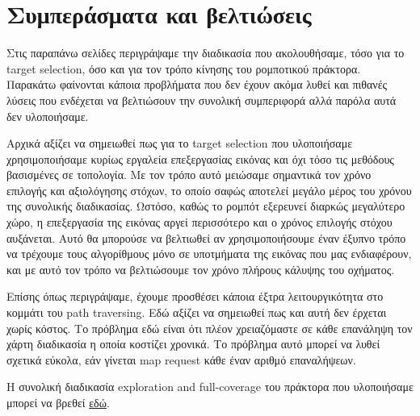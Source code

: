 \section*{Συμπεράσματα και βελτιώσεις}
Στις παραπάνω σελίδες περιγράψαμε την διαδικασία που ακολουθήσαμε, τόσο για το target selection, όσο και για τον τρόπο κίνησης του ρομποτικού πράκτορα. Παρακάτω φαίνονται κάποια προβλήματα που δεν έχουν ακόμα λυθεί και πιθανές λύσεις που ενδέχεται να βελτιώσουν την συνολική συμπεριφορά αλλά παρόλα αυτά δεν υλοποιήσαμε.


Αρχικά αξίζει να σημειωθεί πως για το target selection που υλοποιήσαμε χρησιμοποιήσαμε κυρίως εργαλεία επεξεργασίας εικόνας και όχι τόσο τις μεθόδους βασισμένες σε τοπολογία. Με τον τρόπο αυτό μειώσαμε σημαντικά τον χρόνο επιλογής και αξιολόγησης στόχων, το οποίο σαφώς αποτελεί μεγάλο μέρος του χρόνου της συνολικής διαδικασίας. Ωστόσο, καθώς το ρομπότ εξερευνεί διαρκώς μεγαλύτερο χώρο, η επεξεργασία της εικόνας αργεί περισσότερο και ο χρόνος επιλογής στόχου αυξάνεται. Αυτό θα μπορούσε να βελτιωθεί αν χρησιμοποιήσουμε έναν έξυπνο τρόπο να τρέχουμε τους αλγορίθμους μόνο σε υποτμήματα της εικόνας που μας ενδιαφέρουν, και με αυτό τον τρόπο να βελτιώσουμε τον χρόνο πλήρους κάλυψης του οχήματος.


Επίσης όπως περιγράψαμε, έχουμε προσθέσει κάποια έξτρα λειτουργικότητα στο κομμάτι του path traversing. Εδώ αξίζει να σημειωθεί πως και αυτή δεν έρχεται χωρίς κόστος. Το πρόβλημα εδώ είναι ότι πλέον χρειαζόμαστε σε κάθε επανάληψη τον χάρτη διαδικασία η οποία κοστίζει χρονικά. Το πρόβλημα αυτό μπορεί να λυθεί σχετικά εύκολα, εάν γίνεται map request κάθε έναν αριθμό επαναλήψεων.

Η συνολική διαδικασία exploration and full-coverage του πράκτορα που υλοποιήσαμε μπορεί να βρεθεί \href{https://www.youtube.com/watch?v=Yq3W4A9EtGI&feature=youtu.be}{εδώ}.

